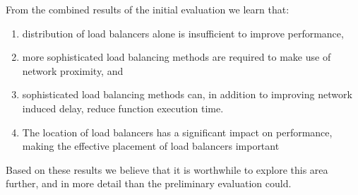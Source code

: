 From the combined results of the initial evaluation we learn that:
\begin{enumerate}
    \item distribution of load balancers alone is insufficient to improve performance,
    \item more sophisticated load balancing methods are required to make use of network proximity, and
    \item sophisticated load balancing methods can, in addition to improving network induced delay, reduce function execution time.
    \item The location of load balancers has a significant impact on performance, making the effective placement of load balancers important
\end{enumerate}
Based on these results we believe that it is worthwhile to explore this area further, and in more detail than the preliminary evaluation could.

